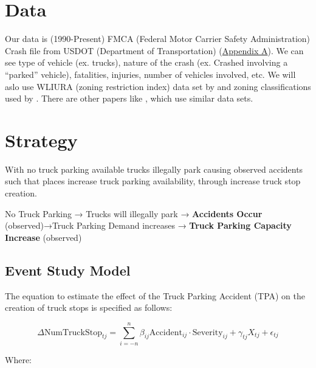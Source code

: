 \documentclass[
  12pt]{article}
\begin{document}
\section{Data}\label{data}

Our data is (1990-Present) FMCA (Federal Motor Carrier Safety
Administration) Crash file from USDOT (Department of Transportation)
(\label{sec:appendix-a}\hyperref[sec-a.-visualization-of-dataset.-]{Appendix
A}). We can see type of vehicle (ex. trucks), nature of the crash (ex.
Crashed involving a ``parked'' vehicle), fatalities, injuries, number of
vehicles involved, etc. We will aslo use WLIURA (zoning restriction
index) data set by \citet{gyourkoNewMeasureLocal2008} and zoning
classifications used by \citet{puentesTraditionalReformedReview2006} .
There are other papers like \citet{liangSafetyInspectionsImprove2021},
which use similar data sets.

\section{\texorpdfstring{\textbf{Strategy}}{Strategy}}\label{strategy}

With no truck parking available trucks illegally park causing observed
accidents such that places increase truck parking availability, through
increase truck stop creation.

No Truck Parking → Trucks will illegally park → \textbf{Accidents Occur}
(observed)→Truck Parking Demand increases → \textbf{Truck Parking
Capacity Increase} (observed)

\subsection{Event Study Model}\label{event-study-model}

The equation to estimate the effect of the Truck Parking Accident (TPA)
on the creation of truck stops is specified as follows:

\[ \Delta \text{NumTruckStop}_{tj} = \sum_{i=-n}^{n} \beta_{ij} \text{Accident}_{ij}\cdot \text{Severity}_{ij} + \gamma_{tj} X_{tj} + \epsilon_{tj} \]

Where:
\end{document}
